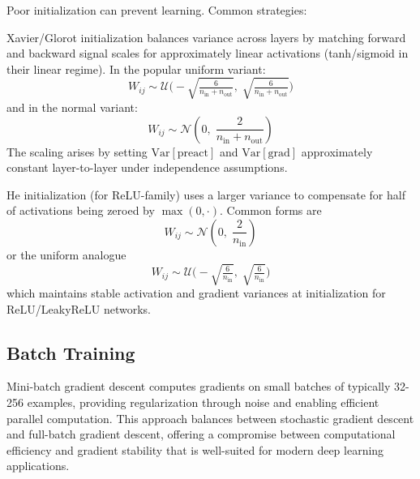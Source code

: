 Poor initialization can prevent learning. Common strategies:

\begin{definition}
Xavier/Glorot initialization balances variance across layers by matching forward and backward signal scales for approximately linear activations (tanh/sigmoid in their linear regime). In the popular uniform variant:
\begin{equation}
W_{ij} \sim \mathcal{U}\Big(-\sqrt{\tfrac{6}{n_{\text{in}} + n_{\text{out}}}},\; \sqrt{\tfrac{6}{n_{\text{in}} + n_{\text{out}}}}\Big)
\end{equation}
and in the normal variant:
\begin{equation}
W_{ij} \sim \mathcal{N}\!\left(0, \; \frac{2}{n_{\text{in}} + n_{\text{out}}}\right)
\end{equation}
The scaling arises by setting $\mathrm{Var}[\text{preact}]$ and $\mathrm{Var}[\text{grad}]$ approximately constant layer-to-layer under independence assumptions.
\end{definition}

\begin{definition}[He Initialization]
He initialization (for ReLU-family) uses a larger variance to compensate for half of activations being zeroed by $\max(0,\cdot)$. Common forms are
\begin{equation}
W_{ij} \sim \mathcal{N}\!\left(0, \; \frac{2}{n_{\text{in}}}\right)
\end{equation}
or the uniform analogue
\begin{equation}
W_{ij} \sim \mathcal{U}\Big(-\sqrt{\tfrac{6}{n_{\text{in}}}},\; \sqrt{\tfrac{6}{n_{\text{in}}}}\Big)
\end{equation}
which maintains stable activation and gradient variances at initialization for ReLU/LeakyReLU networks.
\end{definition}

\subsection{Batch Training}

Mini-batch gradient descent computes gradients on small batches of typically 32-256 examples, providing regularization through noise and enabling efficient parallel computation. This approach balances between stochastic gradient descent and full-batch gradient descent, offering a compromise between computational efficiency and gradient stability that is well-suited for modern deep learning applications.

